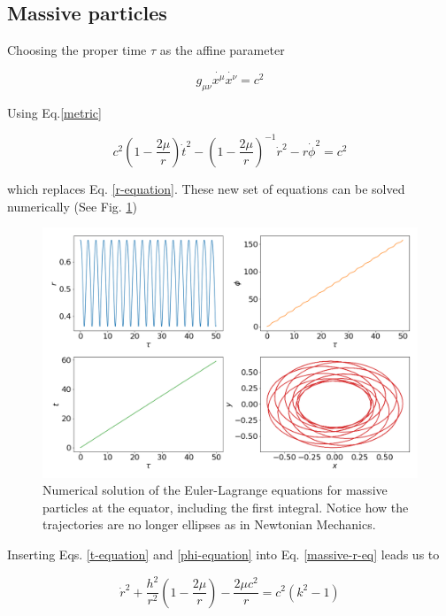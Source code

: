 \documentclass[letterpaper,11pt,onecolumn]{article}
\begin{document}
\subsection{Massive particles}

Choosing the proper time $\tau$ as the affine parameter 

\begin{equation*}
    g_{\mu \nu} \dot{x^\mu} \dot{x^\nu} = c^2
\end{equation*}

Using Eq.\ref{metric} 

\begin{equation} \label{massive-r-eq}
    c^2 \left( 1 - \frac{2 \mu}{r} \right) \dot{t}^2  - \left( 1 - \frac{2 \mu}{r} \right)^{-1} \dot{r}^2 - r\dot{\phi}^2  = c^2
\end{equation}

which replaces Eq. \ref{r-equation}. These new set of equations can be solved numerically (See Fig. \ref{fig:massive-set})


\begin{figure}[h!]
    \centering
    \includegraphics[width=0.8\linewidth]{Presentations/Images/2_first_orbits.png}
    \caption{Numerical solution of the Euler-Lagrange equations for massive particles at the equator, including the first integral. Notice how the trajectories are no longer ellipses as in Newtonian Mechanics. }
    \label{fig:massive-set}
\end{figure}


Inserting Eqs. \ref{t-equation} and \ref{phi-equation} into Eq. \ref{massive-r-eq} leads us to 

\begin{equation} \label{massive-r-tau}
    \dot{r}^2 + \frac{h^2}{r^2} \left( 1 - \frac{2\mu}{r}\right) - \frac{2\mu c^2}{r} = c^2 (k^2 - 1)
\end{equation}
\end{document}
